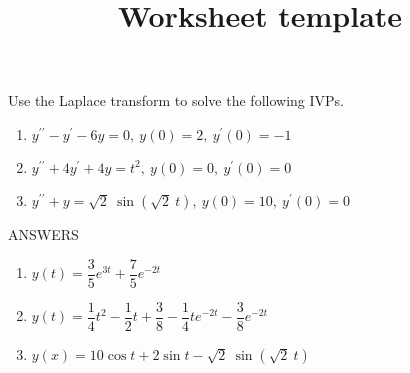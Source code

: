 \documentclass[12pt]{article}
\title{Worksheet template}
\begin{document}
\bigskip
\bigskip

Use the Laplace transform to solve the following IVPs.

\begin{enumerate}

\item
$y^{\prime \prime}- y^{\prime} - 6y = 0, \> y(0) = 2, \> y^{\prime}(0) = -1$

\item
$y^{\prime \prime} + 4y^{\prime} + 4y = t^2, \> y(0) = 0, \> y^{\prime}(0) = 0$

\item
$y^{\prime \prime} + y = \sqrt{2} \> \sin \left( \sqrt{2} \> t \right), \> y(0) = 10, \> y^{\prime}(0) = 0$

\end{enumerate}

\bigskip

\newpage

ANSWERS

\begin{enumerate}
	\item $y(t) = \dfrac{3}{5} e^{3t} + \dfrac{7}{5} e^{-2t}$
	\item $y(t) = \dfrac{1}{4} t^2 - \dfrac{1}{2} t + \dfrac{3}{8} - \dfrac{1}{4} t e^{-2t} 
    	- \dfrac{3}{8} e^{-2t}$
	\item $y(x) = 10 \cos t + 2 \sin t - \sqrt{2} \> \sin \left( \sqrt{2} \> t \right)$
\end{enumerate}
\end{document}
